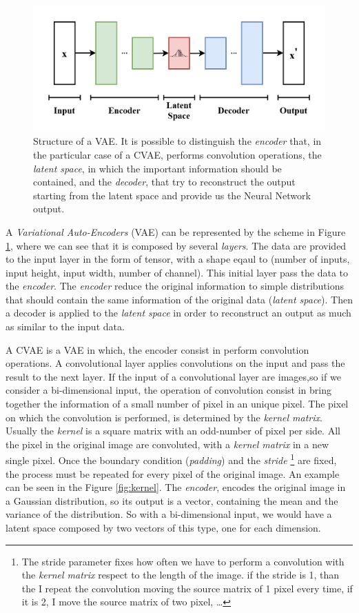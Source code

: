 \documentclass[12pt,a4paper,twocolumn]{article}
\begin{document}
			\begin{figure}[h!] 
				\centering
				\includegraphics[width=1\linewidth]{images/VAE_Basic}
				\caption{Structure of a VAE. It is possible to distinguish the \emph{encoder} that, in the particular case of a CVAE, performs convolution operations, the \emph{ latent space}, in which the important information should be contained, and the \emph{decoder}, that try to reconstruct the output starting from the latent space and provide us the Neural Network output.}
				\label{fig:vaebasic}
			\end{figure}
			A \emph{Variational Auto-Encoders} (VAE) can be represented by the scheme in Figure \ref{fig:vaebasic}, where we can see that it is composed by several \emph{layers}. The data are provided to the input layer in the form of tensor, with a shape eqaul to (number of inputs, input height, input width, number of channel). This initial layer pass the data to the \emph{encoder}. The \emph{encoder} reduce the original information to simple distributions that should contain the same information of the original data (\emph{latent space}). Then a decoder is applied to the \emph{latent space} in order to reconstruct an output as much as similar to the input data.
			
			A CVAE  is a VAE in which, the encoder consist in perform convolution operations. A convolutional layer applies convolutions on the input and pass the result to the next layer. If the input of a convolutional layer are images,so if we consider a bi-dimensional input, the operation of convolution consist in bring together the information of a small number of pixel in an unique pixel. The pixel on which the convolution is performed, is determined by the \emph{kernel matrix}. Usually the \emph{kernel} is a square matrix with an odd-number of pixel per side. All the pixel in the original image are convoluted, with a \emph{kernel matrix} in a new single pixel. Once the boundary condition (\emph{padding}) and the \emph{stride} \footnote{The stride parameter fixes how often we have to perform a convolution with the \emph{kernel matrix} respect to the length of the image. if the stride is 1, than the I repeat the convolution moving the source matrix of 1 pixel every time, if it is 2, I move the source matrix of two pixel, \dots} are fixed, the process must be repeated for every pixel of the original image. An example can be seen in the Figure \ref{fig:kernel}. The \emph{encoder}, encodes the original image in a Gaussian distribution, so its output is a vector, containing the mean and the variance of the distribution. So with a bi-dimensional input, we would have a latent space composed by two vectors of this type, one for each dimension. 
		
\end{document}
